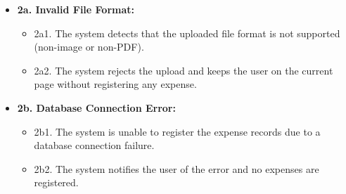 \begin{itemize}[label={}, leftmargin=0.75cm, noitemsep]
    \item \textbf{2a. Invalid File Format:}
    \begin{itemize}[label={}, leftmargin=0.75cm, noitemsep]
        \item 2a1. The system detects that the uploaded file format is not supported (non-image or non-PDF).
        \item 2a2. The system rejects the upload and keeps the user on the current page without registering any expense.
    \end{itemize}

    \item \textbf{2b. Database Connection Error:}
    \begin{itemize}[label={}, leftmargin=0.75cm, noitemsep]
        \item 2b1. The system is unable to register the expense records due to a database connection failure.
        \item 2b2. The system notifies the user of the error and no expenses are registered.
    \end{itemize}
\end{itemize}